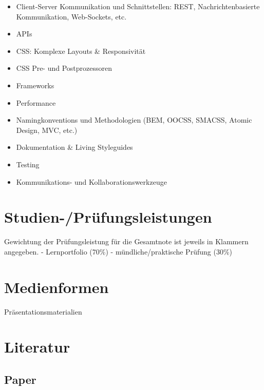 \begin{itemize}
\tightlist
\item
  Client-Server Kommunikation und Schnittstellen: REST,
  Nachrichtenbasierte Kommunikation, Web-Sockets, etc.
\item
  APIs
\item
  CSS: Komplexe Layouts \& Responsivität
\item
  CSS Pre- und Postprozessoren
\item
  Frameworks
\item
  Performance
\item
  Namingkonventions und Methodologien (BEM, OOCSS, SMACSS, Atomic
  Design, MVC, etc.)
\item
  Dokumentation \& Living Styleguides
\item
  Testing
\item
  Kommunikations- und Kollaborationswerkzeuge
\end{itemize}

\section*{Studien-/Prüfungsleistungen\label{/mi-2017/modulbeschreibungen-master/MA_WTW_Modul_Web-Technologien}}\label{studien-pruxfcfungsleistungenpathlabelmi-2017modulbeschreibungen-mastermaux5fwtwux5fmodulux5fweb-technologien}

Gewichtung der Prüfungsleistung für die Gesamtnote ist jeweils in
Klammern angegeben. - Lernportfolio (70\%) - mündliche/praktische
Prüfung (30\%)

\section*{Medienformen\label{/mi-2017/modulbeschreibungen-master/MA_WTW_Modul_Web-Technologien}}\label{medienformenpathlabelmi-2017modulbeschreibungen-mastermaux5fwtwux5fmodulux5fweb-technologien}

Präsentationsmaterialien

\section*{Literatur\label{/mi-2017/modulbeschreibungen-master/MA_WTW_Modul_Web-Technologien}}\label{literaturpathlabelmi-2017modulbeschreibungen-mastermaux5fwtwux5fmodulux5fweb-technologien}

\subsection*{Paper\label{/mi-2017/modulbeschreibungen-master/MA_WTW_Modul_Web-Technologien}}\label{paperpathlabelmi-2017modulbeschreibungen-mastermaux5fwtwux5fmodulux5fweb-technologien}

